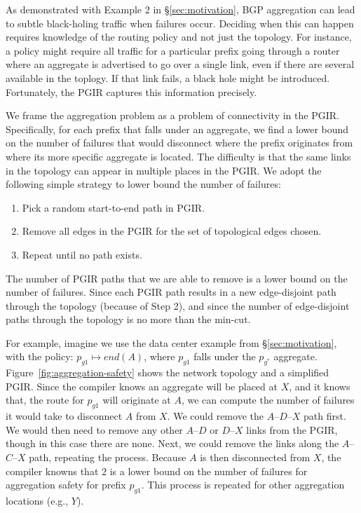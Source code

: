 As demonstrated with Example 2 in \S\ref{sec:motivation}, BGP aggregation can lead to subtle black-holing traffic when failures occur. Deciding when this can happen requires knowledge of the routing policy and not just the topology. For instance, a policy might require all traffic for a particular prefix going through a router where an aggregate is advertised to go over a single link, even if there are several available in the toplogy. If that link fails, a black hole might be introduced. Fortunately, the PGIR captures this information precisely.

We frame the aggregation problem as a problem of connectivity in the PGIR. Specifically, for each prefix that falls under an aggregate, we find a lower bound on the number of failures that would disconnect where the prefix originates from where its more specific aggregate is located. The difficulty is that the same links in the topology can appear in multiple places in the PGIR. We adopt the following simple strategy to lower bound the number of failures:
\begin{enumerate}
	\item Pick a random start-to-end path in PGIR.
	\item Remove all edges in the PGIR for the set of topological edges chosen.
	\item Repeat until no path exists.
\end{enumerate}
The number of PGIR paths that we are able to remove is a lower bound on the number of failures. Since each PGIR path results in a new edge-disjoint path through the topology (because of Step 2), and since the number of edge-disjoint paths through the topology is no more than the min-cut. 

For example, imagine we use the data center example from \S\ref{sec:motivation}, with the policy: $p_{g1} \mapsto end(A)$, where $p_{g1}$ falls under the $p_{g^*}$ aggregate. Figure~\ref{fig:aggregation-safety} shows the network topology and a simplified PGIR. Since the compiler knows an aggregate will be placed at $X$, and it knows that, the route for $p_{g1}$ will originate at $A$, we can compute the number of failures it would take to disconnect $A$ from $X$. We could remove the $A$--$D$--$X$ path first. We would then need to remove any other $A$--$D$ or $D$--$X$ links from the PGIR, though in this case there are none. Next, we could remove the links along the $A$--$C$--$X$ path, repeating the process. Because $A$ is then disconnected from $X$, the compiler knowns that 2 is a lower bound on the number of failures for aggregation safety for prefix $p_{g1}$. This process is repeated for other aggregation locations (e.g., $Y$).


